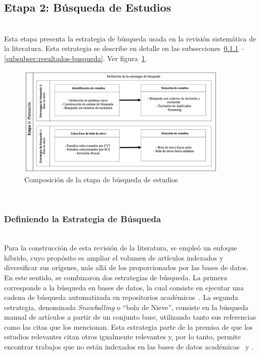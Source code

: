 \subsection{Etapa 2: Búsqueda de Estudios}
\mbox{}\\
Esta etapa presenta la estrategia de búsqueda usada en la revisión sistemática de la literatura. Esta estrategia se describe en detalle en las subsecciones~\ref{subsubsec:Definiendo la Estrategia de Busqueda} -- \ref{subsubsec:resultados-busqueda}. Ver figura~\ref{fig:etapa2}.
\begin{figure}[tbp]
    \centering
    \includegraphics[width=0.9\textwidth]{resources/images/planeacion/estrategias-busqueda.png}
    \caption{Composición de la etapa de búsqueda de estudios}\label{fig:etapa2}
\end{figure}
\mbox{}\\

\subsubsection{Definiendo la Estrategia de Búsqueda}\label{subsubsec:Definiendo la Estrategia de Busqueda}
\mbox{}\\
Para la construcción de esta revisión de la literatura, se empleó un enfoque híbrido, cuyo propósito es ampliar el volumen de artículos indexados y diversificar sus orígenes, más allá de los proporcionados por las bases de datos.
En este sentido, se combinaron dos estrategias de búsqueda. La primera corresponde a la búsqueda en bases de datos, la cual consiste en ejecutar una cadena de búsqueda automatizada en repositorios académicos~\cite{jalali2012systematic}.
La segunda estrategia, denominada \textit{Snowballing} o ``bola de Nieve'', consiste en la búsqueda manual de artículos a partir de un conjunto base, utilizando tanto sus referencias como las citas que los mencionan. Esta estrategia parte de la premisa de que los estudios relevantes citan otros igualmente relevantes y, por lo tanto, permite encontrar trabajos que no están indexados en las bases de datos académicas~\cite{jalali2012systematic} y \cite{goodman1961snowball}.
\mbox{}\\

